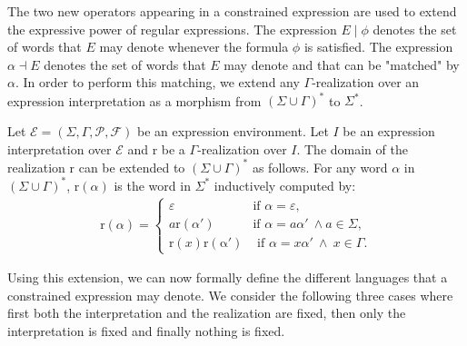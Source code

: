 \documentclass[a4paper]{llncs}
\begin{document}
  The two new operators appearing in a constrained expression are used to extend the expressive power of regular expressions. The expression $E\mid\phi$ denotes the set of words that $E$ may denote whenever the formula $\phi$ is satisfied. The expression $\alpha \dashv E$ denotes the set of words that $E$ may denote and that can be "matched" by $\alpha$. In order to perform this matching, we extend any $\Gamma$-realization over an expression interpretation as a morphism from $(\Sigma\cup\Gamma)^*$ to $\Sigma^*$. 

    Let $\mathcal{E}=(\Sigma,\Gamma,\mathcal{P},\mathcal{F})$ be an expression environment. Let $I$ be an expression interpretation over $\mathcal{E}$ and $\mathrm{r}$ be a $\Gamma$-realization over $I$. The domain of the realization $\mathrm{r}$ can be extended to $(\Sigma\cup\Gamma)^*$ as follows. For any word $\alpha$ in $(\Sigma\cup\Gamma)^*$, $\mathrm{r}(\alpha)$ is the word in $\Sigma^*$ inductively computed by:
      \begin{align*}
      \mathrm{r}(\alpha)=
        \begin{cases}
          \varepsilon & \text{if } \alpha=\varepsilon,\\
          a\mathrm{r}(\alpha') & \text{if } \alpha=a\alpha'\ \wedge a\in \Sigma,\\
          \mathrm{r}(x)\mathrm{r}(\mathrm{\alpha'}) & \text{ if } \alpha=x\alpha' \ \wedge\ x\in\Gamma.
        \end{cases}
      \end{align*}
    
  Using this extension, we can now formally define the different languages that a constrained expression may denote. We consider the following three cases where first both the interpretation and
the realization are fixed, then only the interpretation is fixed
and finally nothing is fixed.
  
\end{document}
